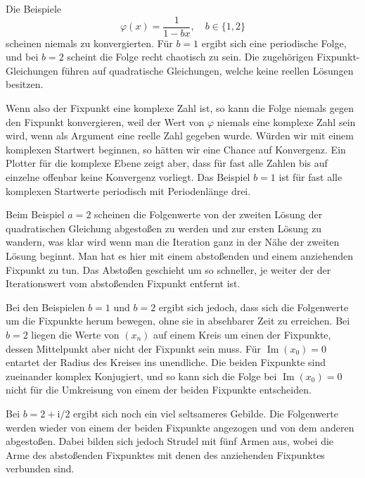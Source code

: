 \documentclass[a4paper,11pt,fleqn,twoside]{scrartcl}
\numberwithin{equation}{section}
\renewcommand{\Im}{\operatorname{Im}}
\newcommand{\ui}{\mathrm i}
\theoremstyle{rmbox}
\begin{document}
Die Beispiele
\begin{equation}
\varphi(x) = \frac{1}{1-bx},\quad b\in\{1,2\}
\end{equation}
scheinen niemals zu konvergierten. Für $b=1$ ergibt sich eine
periodische Folge, und bei $b=2$ scheint die Folge recht
chaotisch zu sein. Die zugehörigen Fixpunkt-Gleichungen führen
auf quadratische Gleichungen, welche keine reellen Lösungen
besitzen.

Wenn also der Fixpunkt eine komplexe Zahl ist, so kann die Folge
niemals gegen den Fixpunkt konvergieren, weil der Wert von $\varphi$
niemals eine komplexe Zahl sein wird, wenn als Argument eine
reelle Zahl gegeben wurde. Würden wir mit einem komplexen Startwert
beginnen, so hätten wir eine Chance auf Konvergenz. Ein Plotter
für die komplexe Ebene zeigt aber, dass für fast alle
Zahlen bis auf einzelne offenbar keine Konvergenz vorliegt.
Das Beispiel $b=1$ ist für fast alle komplexen Startwerte periodisch
mit Periodenlänge drei.

Beim Beispiel $a=2$ scheinen die Folgenwerte von der zweiten
Lösung der quadratischen Gleichung abgestoßen zu werden
und zur ersten Lösung zu wandern, was klar wird wenn man die
Iteration ganz in der Nähe der zweiten Lösung beginnt.
Man hat es hier mit einem abstoßenden und einem anziehenden
Fixpunkt zu tun. Das Abstoßen geschieht um so schneller, je weiter
der der Iterationswert vom abstoßenden Fixpunkt entfernt ist.

Bei den Beispielen $b=1$ und $b=2$ ergibt sich jedoch, dass sich
die Folgenwerte um die Fixpunkte herum bewegen, ohne sie in
absehbarer Zeit zu erreichen. Bei $b=2$ liegen die Werte
von $(x_n)$ auf einem Kreis um einen der Fixpunkte, dessen
Mittelpunkt aber nicht der Fixpunkt sein muss. Für
$\Im(x_0)=0$ entartet der Radius des Kreises ins unendliche. Die
beiden Fixpunkte sind zueinander komplex Konjugiert, und so kann
sich die Folge bei $\Im(x_0)=0$ nicht für die Umkreisung von einem
der beiden Fixpunkte entscheiden.

Bei $b=2+\ui/2$ ergibt sich noch ein viel seltsameres Gebilde.
Die Folgenwerte werden wieder von einem der beiden Fixpunkte
angezogen und von dem anderen abgestoßen. Dabei bilden sich
jedoch Strudel mit fünf Armen aus, wobei die Arme des abstoßenden
Fixpunktes mit denen des anziehenden Fixpunktes verbunden sind.
\end{document}
